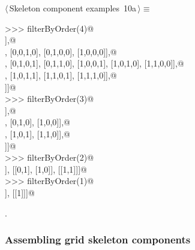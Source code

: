 \documentclass[11pt,oneside]{article}	%
\begin{document}
\begin{flushleft} \small \label{scrap14}
\protect{}$\langle\,$Skeleton component examples\nobreak\ {\footnotesize 10a}$\,\rangle\equiv$
\vspace{-1ex}
\begin{list}{}{} \item
\mbox{}\verb@>>> filterByOrder(4)@\\
\mbox{}\verb@[[[0,0,0,0]],@\\
\mbox{}\verb@ [[0,0,0,1], [0,0,1,0], [0,1,0,0], [1,0,0,0]],@\\
\mbox{}\verb@ [[0,0,1,1], [0,1,0,1], [0,1,1,0], [1,0,0,1], [1,0,1,0], [1,1,0,0]],@\\
\mbox{}\verb@ [[0,1,1,1], [1,0,1,1], [1,1,0,1], [1,1,1,0]],@\\
\mbox{}\verb@ [[1,1,1,1]]]@\\
\mbox{}\verb@>>> filterByOrder(3)@\\
\mbox{}\verb@[[[0,0,0]],@\\
\mbox{}\verb@ [[0,0,1], [0,1,0], [1,0,0]],@\\
\mbox{}\verb@ [[0,1,1], [1,0,1], [1,1,0]],@\\
\mbox{}\verb@ [[1,1,1]]]@\\
\mbox{}\verb@>>> filterByOrder(2)@\\
\mbox{}\verb@[[[0,0]], [[0,1], [1,0]], [[1,1]]]@\\
\mbox{}\verb@>>> filterByOrder(1)@\\
\mbox{}\verb@[[[0]], [[1]]]@\\
\mbox{}\verb@@{\NWsep}
\end{list}
\vspace{-1ex}
\footnotesize\addtolength{\baselineskip}{-1ex}
\begin{list}{}{\setlength{\itemsep}{-\parsep}\setlength{\itemindent}{-\leftmargin}}
\item {\NWtxtMacroNoRef}.
\end{list}
\end{flushleft}


\subsubsection{Assembling grid skeleton components}
\label{sec:assembly}
\end{document}
